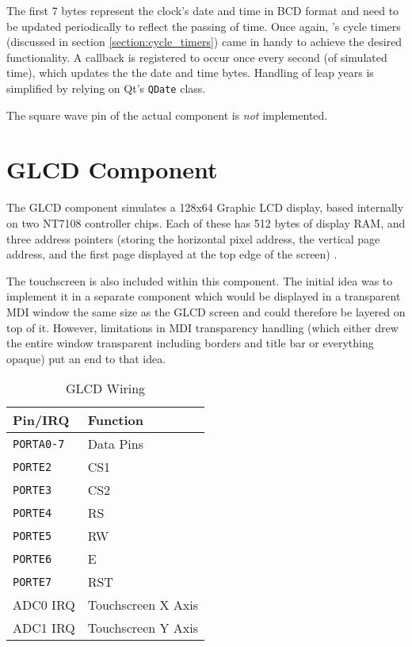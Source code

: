The first 7 bytes represent the clock's date and time in \ac{BCD} format and need
to be updated periodically to reflect the passing of time. Once again,
\simavr's cycle timers (discussed in section \ref{section:cycle_timers}) came in
handy to achieve the desired functionality. A callback is registered to occur
once every second (of simulated time), which updates the the date
and time bytes. Handling of leap years is simplified by relying on Qt's
\lstinline|QDate| class.

The square wave pin of the actual component is \emph{not} implemented.

\section{\acs{GLCD} Component} \label{section:component_glcd}

The \ac{GLCD} component simulates a 128x64 Graphic \ac{LCD} display, based internally
on two NT7108 controller chips. Each of these has 512 bytes of display \ac{RAM},
and three address pointers (storing the horizontal pixel address, the vertical page
address, and the first page displayed at the top edge of the screen)
\cite{winstar01, samsung01, neotec01}.

The touchscreen is also included within this component. The initial idea was to
implement it in a separate component which would be displayed in a transparent
\ac{MDI} window the same size as the \ac{GLCD} screen and could therefore be
layered on top of it. However, limitations in \ac{MDI} transparency handling
(which either drew the entire window transparent including borders and title bar
or everything opaque) put an end to that idea.

\begin{table}[ht]
\centering
\begin{tabular}{ll}
\toprule

Pin/\ac{IRQ}        & Function \\

\midrule

\lstinline|PORTA0-7|& Data Pins\\
\lstinline|PORTE2|  & \acf{CS1}\\
\lstinline|PORTE3|  & \acf{CS2}\\
\lstinline|PORTE4|  & \acf{RS}\\
\lstinline|PORTE5|  & \acf{RW}\\
\lstinline|PORTE6|  & \acf{E}\\
\lstinline|PORTE7|  & \acf{RST}\\
\ac{ADC}0 \ac{IRQ}  & Touchscreen X Axis\\
\ac{ADC}1 \ac{IRQ}  & Touchscreen Y Axis\\

\bottomrule
\end{tabular}
\caption{\ac{GLCD} Wiring}
\label{tab:wiring_glcd}
\end{table}



